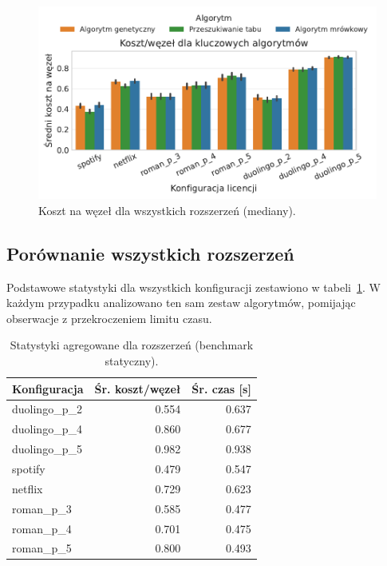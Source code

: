 \begin{figure}[H]
  \centering
  \includegraphics[width=0.6\linewidth]{assets/figures/extensions/static/cost_per_node_by_license_targets.pdf}
  \caption{Koszt na węzeł dla wszystkich rozszerzeń (mediany).}
  \label{fig:ext-license-cost}
\end{figure}


\subsection{Porównanie wszystkich rozszerzeń}

Podstawowe statystyki dla wszystkich konfiguracji zestawiono w tabeli~\ref{tab:ext-overall-static}. W każdym przypadku analizowano ten sam zestaw algorytmów, pomijając obserwacje z przekroczeniem limitu czasu.

\begin{table}[H]
  \centering
  \caption{Statystyki agregowane dla rozszerzeń (benchmark statyczny).}
  \label{tab:ext-overall-static}
  \begin{tabular}{lrr}
    \toprule
    \textbf{Konfiguracja} & \textbf{Śr. koszt/węzeł} & \textbf{Śr. czas [s]} \\
    \midrule
    duolingo\_p\_2        & 0.554                    & 0.637                 \\
    duolingo\_p\_4        & 0.860                    & 0.677                 \\
    duolingo\_p\_5        & 0.982                    & 0.938                 \\
    spotify               & 0.479                    & 0.547                 \\
    netflix               & 0.729                    & 0.623                 \\
    roman\_p\_3           & 0.585                    & 0.477                 \\
    roman\_p\_4           & 0.701                    & 0.475                 \\
    roman\_p\_5           & 0.800                    & 0.493                 \\
  \end{tabular}
\end{table}


